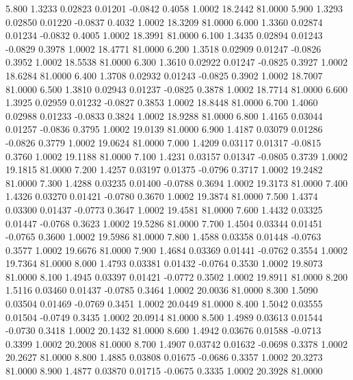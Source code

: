    5.800   1.3233   0.02823   0.01201  -0.0842   0.4058   1.0002  18.2442  81.0000
   5.900   1.3293   0.02850   0.01220  -0.0837   0.4032   1.0002  18.3209  81.0000
   6.000   1.3360   0.02874   0.01234  -0.0832   0.4005   1.0002  18.3991  81.0000
   6.100   1.3435   0.02894   0.01243  -0.0829   0.3978   1.0002  18.4771  81.0000
   6.200   1.3518   0.02909   0.01247  -0.0826   0.3952   1.0002  18.5538  81.0000
   6.300   1.3610   0.02922   0.01247  -0.0825   0.3927   1.0002  18.6284  81.0000
   6.400   1.3708   0.02932   0.01243  -0.0825   0.3902   1.0002  18.7007  81.0000
   6.500   1.3810   0.02943   0.01237  -0.0825   0.3878   1.0002  18.7714  81.0000
   6.600   1.3925   0.02959   0.01232  -0.0827   0.3853   1.0002  18.8448  81.0000
   6.700   1.4060   0.02988   0.01233  -0.0833   0.3824   1.0002  18.9288  81.0000
   6.800   1.4165   0.03044   0.01257  -0.0836   0.3795   1.0002  19.0139  81.0000
   6.900   1.4187   0.03079   0.01286  -0.0826   0.3779   1.0002  19.0624  81.0000
   7.000   1.4209   0.03117   0.01317  -0.0815   0.3760   1.0002  19.1188  81.0000
   7.100   1.4231   0.03157   0.01347  -0.0805   0.3739   1.0002  19.1815  81.0000
   7.200   1.4257   0.03197   0.01375  -0.0796   0.3717   1.0002  19.2482  81.0000
   7.300   1.4288   0.03235   0.01400  -0.0788   0.3694   1.0002  19.3173  81.0000
   7.400   1.4326   0.03270   0.01421  -0.0780   0.3670   1.0002  19.3874  81.0000
   7.500   1.4374   0.03300   0.01437  -0.0773   0.3647   1.0002  19.4581  81.0000
   7.600   1.4432   0.03325   0.01447  -0.0768   0.3623   1.0002  19.5286  81.0000
   7.700   1.4504   0.03344   0.01451  -0.0765   0.3600   1.0002  19.5986  81.0000
   7.800   1.4588   0.03358   0.01448  -0.0763   0.3577   1.0002  19.6676  81.0000
   7.900   1.4684   0.03369   0.01441  -0.0762   0.3554   1.0002  19.7364  81.0000
   8.000   1.4793   0.03381   0.01432  -0.0764   0.3530   1.0002  19.8073  81.0000
   8.100   1.4945   0.03397   0.01421  -0.0772   0.3502   1.0002  19.8911  81.0000
   8.200   1.5116   0.03460   0.01437  -0.0785   0.3464   1.0002  20.0036  81.0000
   8.300   1.5090   0.03504   0.01469  -0.0769   0.3451   1.0002  20.0449  81.0000
   8.400   1.5042   0.03555   0.01504  -0.0749   0.3435   1.0002  20.0914  81.0000
   8.500   1.4989   0.03613   0.01544  -0.0730   0.3418   1.0002  20.1432  81.0000
   8.600   1.4942   0.03676   0.01588  -0.0713   0.3399   1.0002  20.2008  81.0000
   8.700   1.4907   0.03742   0.01632  -0.0698   0.3378   1.0002  20.2627  81.0000
   8.800   1.4885   0.03808   0.01675  -0.0686   0.3357   1.0002  20.3273  81.0000
   8.900   1.4877   0.03870   0.01715  -0.0675   0.3335   1.0002  20.3928  81.0000
